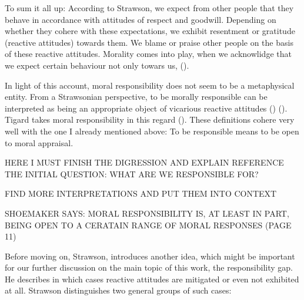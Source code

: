 \documentclass{article}
\begin{document}
To sum it all up: According to Strawson, we expect from other people that they
behave in accordance with attitudes of respect and goodwill. Depending on
whether they cohere with these expectations, we exhibit resentment or gratitude
(reactive attitudes) towards them. We blame or praise other people on the basis
of these reactive attitudes. Morality comes into play, when we acknowlidge that
we expect certain behaviour not only towars us,  (\cite[p.16]{Strawson1962}).

In light of this account, moral responsibility does not seem to be a metaphysical entity.
From a Strawsonian perspective, to be morally responsible can be interpreted as
being an appropriate object of vicarious reactive attitudes
(\cite[p.3]{SmithVickers2021}) (\cite[p.175]{Matthias_2004}). Tigard takes moral
responsibility in this regard  (\cite[p.3]{Tigard_2020}). 
These definitions cohere very well with the one I already mentioned above: To be
responsible means to be open to moral appraisal.

HERE I MUST FINISH THE DIGRESSION AND EXPLAIN REFERENCE THE INITIAL QUESTION:
WHAT ARE WE RESPONSIBLE FOR?

FIND MORE INTERPRETATIONS AND PUT THEM
INTO CONTEXT

SHOEMAKER SAYS: MORAL RESPONSIBILITY IS, AT LEAST IN PART, BEING OPEN TO A
CERATAIN RANGE OF MORAL RESPONSES (PAGE 11)


Before moving on, Strawson, introduces another idea, which might be important for
our further discussion on the main topic of this work, the responsibility gap.
He describes in which cases reactive attitudes are mitigated or even not
exhibited at all. Strawson distinguishes two general groups of such cases:
\end{document}

